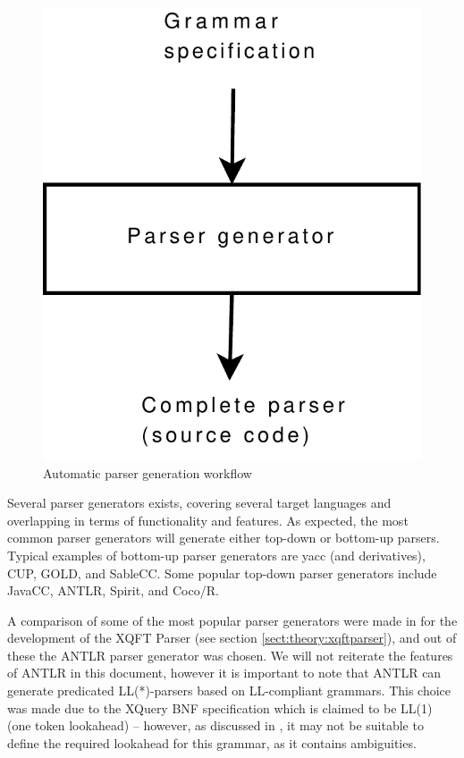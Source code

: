 \begin{figure}[h]
  \centering
    \includegraphics[scale=0.40]{diagrams/parser_generator}
  \caption{Automatic parser generation workflow}
  \label{figure:parser:generator}
\end{figure}

Several parser generators exists, covering several target languages and
overlapping in terms of functionality and features. As expected, the most
common parser generators will generate either top-down or bottom-up parsers. Typical examples of bottom-up parser
generators are yacc (and derivatives), CUP, GOLD, and SableCC. Some popular
top-down parser generators include JavaCC, ANTLR, Spirit, and Coco/R.

A comparison of some of the most popular parser generators were made in
\cite{ourselves} for the development of the XQFT Parser (see section \ref{sect:theory:xqftparser}), and out of
these the ANTLR parser generator was chosen. We will not reiterate the features of ANTLR in this document, however
it is important to note that ANTLR can generate predicated LL(*)-parsers\cite{definitiveAntlr} based on
LL-compliant grammars. This choice was made due to the XQuery BNF specification
which is claimed to be LL(1) (one token lookahead) -- however, as discussed in
\cite{ourselves}, it may not be suitable to define the required lookahead for this grammar, as it contains
ambiguities.

